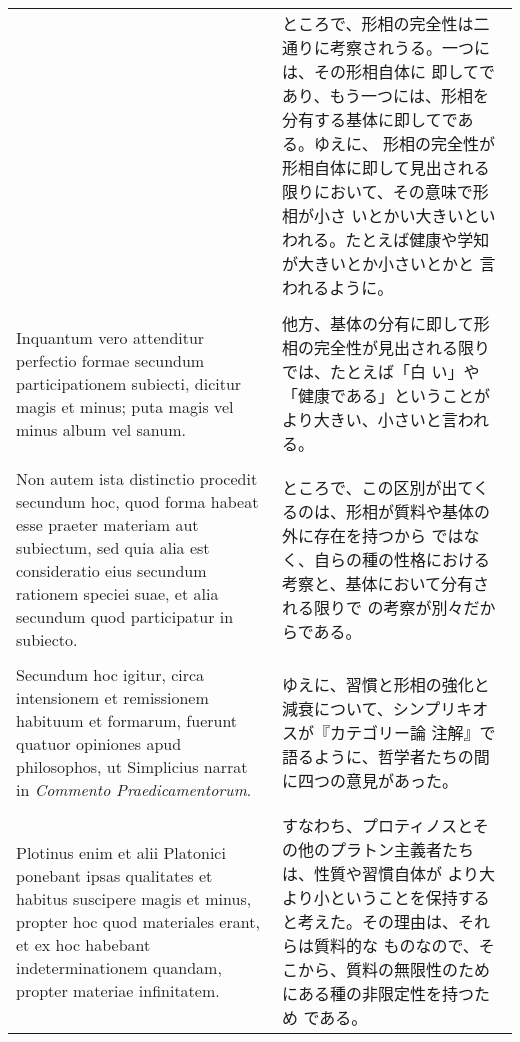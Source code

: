 \documentclass[10pt]{jsarticle} %
\begin{document}
\begin{longtable}{p{21em}p{21em}}
&

ところで、形相の完全性は二通りに考察されうる。一つには、その形相自体に
即してであり、もう一つには、形相を分有する基体に即してである。ゆえに、
 形相の完全性が形相自体に即して見出される限りにおいて、その意味で形相が小さ
 いとかい大きいといわれる。たとえば健康や学知が大きいとか小さいとかと
 言われるように。

\\\\


Inquantum vero attenditur perfectio formae
secundum participationem subiecti, dicitur magis et minus; puta magis
vel minus album vel sanum. 


&

他方、基体の分有に即して形相の完全性が見出される限りでは、たとえば「白
 い」や「健康である」ということがより大きい、小さいと言われる。

\\\\


Non autem ista distinctio procedit secundum
hoc, quod forma habeat esse praeter materiam aut subiectum, sed quia
alia est consideratio eius secundum rationem speciei suae, et alia
secundum quod participatur in subiecto. 


&

ところで、この区別が出てくるのは、形相が質料や基体の外に存在を持つから
 ではなく、自らの種の性格における考察と、基体において分有される限りで
 の考察が別々だからである。

\\\\


Secundum hoc igitur, circa
intensionem et remissionem habituum et formarum, fuerunt quatuor
opiniones apud philosophos, ut Simplicius narrat in {\itshape Commento
Praedicamentorum}. 


&

ゆえに、習慣と形相の強化と減衰について、シンプリキオスが『カテゴリー論
 注解』で語るように、哲学者たちの間に四つの意見があった。

\\\\


Plotinus enim et alii Platonici ponebant ipsas
qualitates et habitus suscipere magis et minus, propter hoc quod
materiales erant, et ex hoc habebant indeterminationem quandam,
propter materiae infinitatem. 


&

すなわち、プロティノスとその他のプラトン主義者たちは、性質や習慣自体が
より大より小ということを保持すると考えた。その理由は、それらは質料的な
 ものなので、そこから、質料の無限性のためにある種の非限定性を持つため
 である。


\end{longtable}
\end{document}
